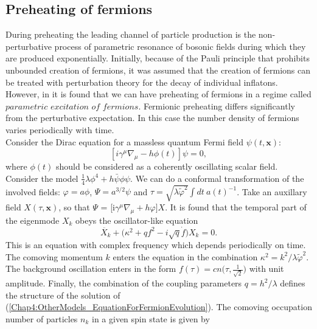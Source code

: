 \documentclass[11pt,a4paper,twoside]{book}
\begin{document}
\subsection{Preheating of fermions}
During preheating the leading channel of particle production is the non-perturbative process of parametric resonance of bosonic fields during which they are produced exponentially. Initially, because of the Pauli principle that prohibits unbounded creation of fermions, it was assumed that the creation of fermions can be treated with perturbation theory for the decay of individual inflatons. However, in \cite{Chap4:FermionPreheating} it is found that we can have preheating of fermions in a regime called $ \textit{parametric excitation of fermions} $. Fermionic preheating differs significantly from the perturbative expectation. In this case the number density of fermions varies periodically with time.\\
Consider the Dirac equation for a massless quantum Fermi field $\psi(t,\textbf{x})$:
\begin{equation}
\label{Chap4:OtherModels_DiracEquation}
[i\gamma^{\mu}\nabla_{\mu} - h\phi(t)]\psi = 0,
\end{equation}
where $\phi(t)$ should be considered as a coherently oscillating scalar field.\\
Consider the model $ \frac{1}{4}\lambda \phi^{4} + h\bar{\psi}\phi\psi $. We can do a conformal transformation of the involved fields: $\varphi=a\phi$, $\Psi=a^{3/2}\psi$ and $\tau=\sqrt{\lambda \tilde{\varphi}^{2}}\int dt\  a(t)^{-1}$. Take an auxillary field $ X(\tau,\textbf{x}) $, so that $\Psi$ = [i$\gamma^{\mu}\nabla_{\mu} + h\varphi]X$. It is found that the temporal part of the eigenmode $ X_{k} $ obeys the oscillator-like equation \cite{Chap4:FermionPreheating}
\begin{equation}
\label{Chap4:OtherModels_EquationForFermionEvolution}
\ddot{X_{k}} + \Bigg(\kappa^{2} + qf^{2} - i\sqrt{q}\dot{f}\Bigg)X_{k}=0.
\end{equation}
This is an equation with complex frequency which depends periodically on time. The comoving momentum $ k $ enters the equation in the combination $\kappa^{2}=k^{2}/\lambda\tilde{\varphi}^{2}$. The background oscillation enters in the form $ f(\tau) = cn\Bigg(\tau,\frac{1}{\sqrt{2}}\Bigg) $ with unit amplitude. Finally, the combination of the coupling parameters  $ q=h^{2}/\lambda $ defines the structure of the solution of (\ref{Chap4:OtherModels_EquationForFermionEvolution}). The comoving occupation number of particles $ n_{k} $ in a given spin state is given by
\end{document}
